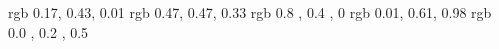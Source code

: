 
\usepackage{color}
\usepackage{courier}

\definecolor{arduinoGreen}    {rgb} {0.17, 0.43, 0.01}
\definecolor{arduinoGrey}     {rgb} {0.47, 0.47, 0.33}
\definecolor{arduinoOrange}   {rgb} {0.8 , 0.4 , 0   }
\definecolor{arduinoBlue}     {rgb} {0.01, 0.61, 0.98}
\definecolor{arduinoDarkBlue} {rgb} {0.0 , 0.2 , 0.5 }

